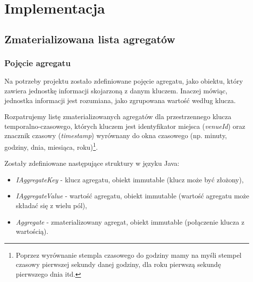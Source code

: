 \section{Implementacja}
\label{sec:impl}

\subsection{Zmaterializowana lista agregatów}
\subsubsection{Pojęcie agregatu}
\label{sec:impl-mal-aggregate}

Na potrzeby projektu zostało zdefiniowane pojęcie agregatu\cite{mal-lru-gorawski}, jako obiektu, który zawiera jednostkę informacji skojarzoną z danym kluczem. Inaczej mówiąc, jednostka informacji jest rozumiana, jako zgrupowana wartość według klucza.

Rozpatrujemy listę zmaterializowanych agregatów dla przestrzennego klucza temporalno-czasowego, których kluczem jest identyfikator miejsca (\emph{venueId}) oraz znacznik czasowy (\emph{timestamp}) wyrównany do okna czasowego (np. minuty, godziny, dnia, miesiąca, roku)\footnote{Poprzez wyrównanie stempla czasowego do godziny mamy na myśli stempel czasowy pierwszej sekundy danej godziny, dla roku pierwszą sekundę pierwszego dnia itd.}.

Zostały zdefiniowane następujące struktury w języku Java:

\begin{itemize}[noitemsep]
\item \emph{IAggregateKey} - klucz agregatu, obiekt immutable (klucz może być złożony),
\item \emph{IAggregateValue} - wartość agregatu, obiekt immutable (wartość agregatu może składać się z wielu pól),
\item \emph{Aggregate} - zmaterializowany agregat, obiekt immutable (połączenie klucza z wartością).
\end{itemize}







